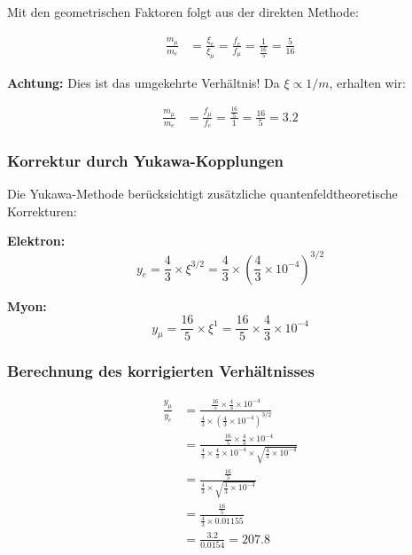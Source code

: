 \documentclass[12pt,a4paper]{article}
\theoremstyle{definition}
\begin{document}
Mit den geometrischen Faktoren folgt aus der direkten Methode:

\begin{align}
	\frac{m_\mu}{m_e} &= \frac{\xi_e}{\xi_\mu} = \frac{f_e}{f_\mu} = \frac{1}{\frac{16}{5}} = \frac{5}{16}
\end{align}

\textbf{Achtung:} Dies ist das umgekehrte Verh{\"a}ltnis! Da $\xi \propto 1/m$, erhalten wir:

\begin{align}
	\frac{m_\mu}{m_e} &= \frac{f_\mu}{f_e} = \frac{\frac{16}{5}}{1} = \frac{16}{5} = 3.2
\end{align}

\subsubsection{Korrektur durch Yukawa-Kopplungen}

Die Yukawa-Methode ber{\"u}cksichtigt zus{\"a}tzliche quantenfeldtheoretische Korrekturen:

\textbf{Elektron:}
\begin{equation}
	y_e = \frac{4}{3} \times \xi^{3/2} = \frac{4}{3} \times \left(\frac{4}{3} \times 10^{-4}\right)^{3/2}
\end{equation}

\textbf{Myon:}
\begin{equation}
	y_\mu = \frac{16}{5} \times \xi^1 = \frac{16}{5} \times \frac{4}{3} \times 10^{-4}
\end{equation}

\subsubsection{Berechnung des korrigierten Verh{\"a}ltnisses}

\begin{align}
	\frac{y_\mu}{y_e} &= \frac{\frac{16}{5} \times \frac{4}{3} \times 10^{-4}}{\frac{4}{3} \times \left(\frac{4}{3} \times 10^{-4}\right)^{3/2}}\\
	&= \frac{\frac{16}{5} \times \frac{4}{3} \times 10^{-4}}{\frac{4}{3} \times \frac{4}{3} \times 10^{-4} \times \sqrt{\frac{4}{3} \times 10^{-4}}}\\
	&= \frac{\frac{16}{5}}{\frac{4}{3} \times \sqrt{\frac{4}{3} \times 10^{-4}}}\\
	&= \frac{\frac{16}{5}}{\frac{4}{3} \times 0.01155}\\
	&= \frac{3.2}{0.0154} = 207.8
\end{align}
\end{document}
